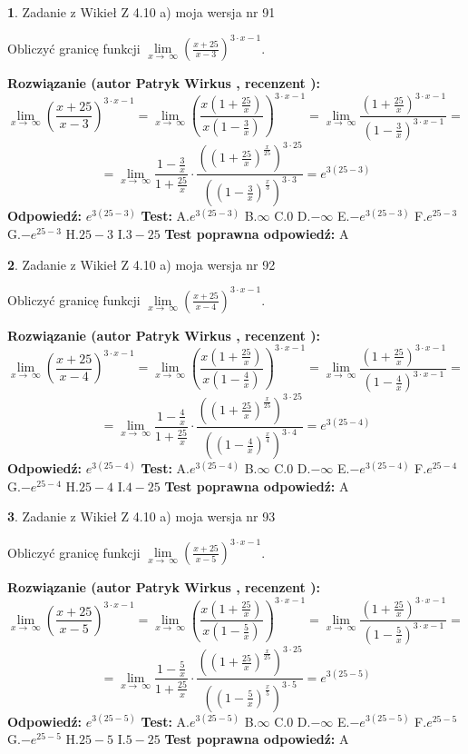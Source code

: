 \documentclass[12pt, a4paper]{article}
\theoremstyle{definition} %
\newtheorem{zad}{}
\newcommand{\zadStart}[1]{\begin{zad}#1\newline}
\newcommand{\zadStop}{\end{zad}}
\newcommand{\rozwStart}[2]{\noindent \textbf{Rozwiązanie (autor #1 , recenzent #2): }\newline}
\newcommand{\rozwStop}{\newline}
\newcommand{\odpStart}{\noindent \textbf{Odpowiedź:}\newline}
\newcommand{\odpStop}{\newline}
\newcommand{\testStart}{\noindent \textbf{Test:}\newline}
\newcommand{\testStop}{\newline}
\newcommand{\kluczStart}{\noindent \textbf{Test poprawna odpowiedź:}\newline}
\newcommand{\kluczStop}{\newline}
\begin{document}
\zadStart{Zadanie z Wikieł Z 4.10 a) moja wersja nr 91}


Obliczyć granicę funkcji  $\lim\limits_{x\to\ \infty}(\frac{x+25}{x-3})^{3\cdot x-1}$.
\zadStop
\rozwStart{Patryk Wirkus}{}
$$\lim\limits_{x\to\ \infty}(\frac{x+25}{x-3})^{3\cdot x-1} = \lim\limits_{x\to\ \infty}(\frac{x(1+\frac{25}{x})}{x(1-\frac{3}{x})})^{3\cdot x-1}=\lim\limits_{x\to\ \infty}\frac{(1+\frac{25}{x})^{3\cdot x-1}}{(1-\frac{3}{x})^{3\cdot x-1}}=$$
$$=\lim\limits_{x\to\ \infty}\frac{1-\frac{3}{x}}{1+\frac{25}{x}}\cdot\frac{((1+\frac{25}{x})^{\frac{x}{25}})^{3\cdot25}}{((1-\frac{3}{x})^{\frac{x}{3}})^{3\cdot3}}=e^{3(25-3)}$$
\rozwStop
\odpStart
$e^{3(25-3)}$
\odpStop
\testStart
A.$e^{3(25-3)}$ B.$\infty$ C.$0$ D.$-\infty$ E.$-e^{3(25-3)}$
F.$e^{25-3}$ G.$-e^{25-3}$
H.$25-3$
I.$3-25$
\testStop
\kluczStart
A
\kluczStop



\zadStart{Zadanie z Wikieł Z 4.10 a) moja wersja nr 92}


Obliczyć granicę funkcji  $\lim\limits_{x\to\ \infty}(\frac{x+25}{x-4})^{3\cdot x-1}$.
\zadStop
\rozwStart{Patryk Wirkus}{}
$$\lim\limits_{x\to\ \infty}(\frac{x+25}{x-4})^{3\cdot x-1} = \lim\limits_{x\to\ \infty}(\frac{x(1+\frac{25}{x})}{x(1-\frac{4}{x})})^{3\cdot x-1}=\lim\limits_{x\to\ \infty}\frac{(1+\frac{25}{x})^{3\cdot x-1}}{(1-\frac{4}{x})^{3\cdot x-1}}=$$
$$=\lim\limits_{x\to\ \infty}\frac{1-\frac{4}{x}}{1+\frac{25}{x}}\cdot\frac{((1+\frac{25}{x})^{\frac{x}{25}})^{3\cdot25}}{((1-\frac{4}{x})^{\frac{x}{4}})^{3\cdot4}}=e^{3(25-4)}$$
\rozwStop
\odpStart
$e^{3(25-4)}$
\odpStop
\testStart
A.$e^{3(25-4)}$ B.$\infty$ C.$0$ D.$-\infty$ E.$-e^{3(25-4)}$
F.$e^{25-4}$ G.$-e^{25-4}$
H.$25-4$
I.$4-25$
\testStop
\kluczStart
A
\kluczStop



\zadStart{Zadanie z Wikieł Z 4.10 a) moja wersja nr 93}


Obliczyć granicę funkcji  $\lim\limits_{x\to\ \infty}(\frac{x+25}{x-5})^{3\cdot x-1}$.
\zadStop
\rozwStart{Patryk Wirkus}{}
$$\lim\limits_{x\to\ \infty}(\frac{x+25}{x-5})^{3\cdot x-1} = \lim\limits_{x\to\ \infty}(\frac{x(1+\frac{25}{x})}{x(1-\frac{5}{x})})^{3\cdot x-1}=\lim\limits_{x\to\ \infty}\frac{(1+\frac{25}{x})^{3\cdot x-1}}{(1-\frac{5}{x})^{3\cdot x-1}}=$$
$$=\lim\limits_{x\to\ \infty}\frac{1-\frac{5}{x}}{1+\frac{25}{x}}\cdot\frac{((1+\frac{25}{x})^{\frac{x}{25}})^{3\cdot25}}{((1-\frac{5}{x})^{\frac{x}{5}})^{3\cdot5}}=e^{3(25-5)}$$
\rozwStop
\odpStart
$e^{3(25-5)}$
\odpStop
\testStart
A.$e^{3(25-5)}$ B.$\infty$ C.$0$ D.$-\infty$ E.$-e^{3(25-5)}$
F.$e^{25-5}$ G.$-e^{25-5}$
H.$25-5$
I.$5-25$
\testStop
\kluczStart
A
\kluczStop
\end{document}
